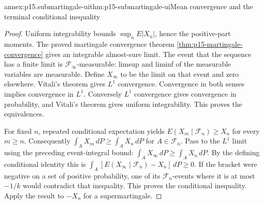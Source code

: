 \begin{annexitem}{annex:p15.submartingale-ui}{thm:p15-submartingale-ui}{Mean convergence and the terminal conditional inequality}
\begin{proof}
Uniform integrability bounds \(\sup_nE|X_n|\), hence the positive-part
moments. The proved martingale convergence theorem
\cref{thm:p15-martingale-convergence} gives an integrable almost-sure
limit. The event that the sequence has a finite limit is
\(\mathcal F_\infty\)-measurable: limsup and liminf of the measurable
variables are measurable. Define \(X_\infty\) to be the limit on that
event and zero elsewhere. Vitali's theorem gives \(L^1\) convergence.
Convergence in both senses implies convergence in \(L^1\). Conversely
\(L^1\) convergence gives convergence in probability, and Vitali's
theorem gives uniform integrability. This proves the equivalences.

For fixed \(n\), repeated conditional expectation yields
\(E(X_m\mid\mathcal F_n)\geq X_n\) for every \(m\geq n\).
Consequently \(\int_A X_m\,dP\geq\int_A X_n\,dP\) for \(A\in\mathcal F_n\).
Pass to the \(L^1\) limit using the preceding event-integral bound:
\(\int_A X_\infty\,dP\geq\int_A X_n\,dP\).
By the defining conditional identity this is
\(\int_A[E(X_\infty\mid\mathcal F_n)-X_n]\,dP\geq0\).
If the bracket were negative on a set of positive probability, one
of its \(\mathcal F_n\)-events where it is at most \(-1/k\)
would contradict that inequality. This proves the conditional inequality.
Apply the result to \(-X_n\) for a supermartingale.
\end{proof}
\end{annexitem}

